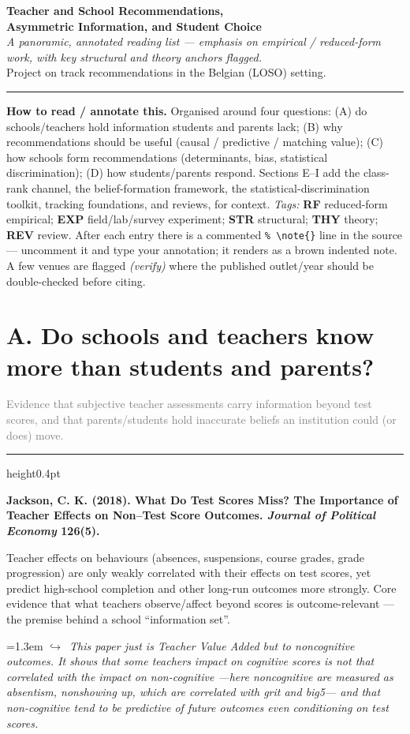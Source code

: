 \documentclass[11pt]{article}
\newcommand{\entry}[3]{%
  \par\medskip\noindent\textbf{#1}\par
  \nopagebreak #2\hspace{0.35em}{\small\color{tagcol}[#3]}\par}
\newcommand{\note}[1]{\par\smallskip\noindent\hangindent=1.3em
  \textcolor{notecol}{\footnotesize$\hookrightarrow$~\textit{#1}}}
\newcommand{\secintro}[1]{\par\smallskip\noindent\textcolor{grey}{\small #1}\par
  \vspace{2pt}\hrule height0.4pt\vspace{4pt}}
\begin{document}
\begin{center}
{\LARGE\bfseries\color{dark} Teacher and School Recommendations,\\[2pt]
Asymmetric Information, and Student Choice}\\[6pt]
{\color{grey}\itshape A panoramic, annotated reading list --- emphasis on empirical /
reduced-form work, with key structural and theory anchors flagged.}\\[2pt]
{\color{grey}\small Project on track recommendations in the Belgian (LOSO) setting.}
\end{center}
\vspace{4pt}
\hrule
\vspace{8pt}

\noindent\textbf{How to read / annotate this.} Organised around four questions:
(A) do schools/teachers hold information students and parents lack;
(B) why recommendations should be useful (causal / predictive / matching value);
(C) how schools form recommendations (determinants, bias, statistical discrimination);
(D) how students/parents respond. Sections E--I add the class-rank channel, the
belief-formation framework, the statistical-discrimination toolkit, tracking
foundations, and reviews, for context. \emph{Tags:}
\textbf{RF} reduced-form empirical; \textbf{EXP} field/lab/survey experiment;
\textbf{STR} structural; \textbf{THY} theory; \textbf{REV} review.
After each entry there is a commented \verb|% \note{}| line in the source ---
uncomment it and type your annotation; it renders as a brown indented note.
A few venues are flagged \emph{(verify)} where the published outlet/year should be
double-checked before citing.

\section{A. Do schools and teachers know more than students and parents?}
\secintro{Evidence that subjective teacher assessments carry information beyond
test scores, and that parents/students hold inaccurate beliefs an institution
could (or does) move.}





\entry{Jackson, C. K. (2018). What Do Test Scores Miss? The Importance of Teacher
Effects on Non--Test Score Outcomes. \textit{Journal of Political Economy}
126(5).}
{Teacher effects on behaviours (absences, suspensions, course grades, grade
progression) are only weakly correlated with their effects on test scores, yet
predict high-school completion and other long-run outcomes more strongly. Core
evidence that what teachers observe/affect beyond scores is outcome-relevant ---
the premise behind a school ``information set''.}{RF}
\note{This paper just is Teacher Value Added but to noncognitive outcomes. It shows that some teachers impact on cognitive scores is not that correlated with the impact on non-cognitive ---here noncognitive are measured as absentism, nonshowing up, which are correlated with grit and big5--- and that non-cognitive tend to be predictive of future outcomes even conditioning on test scores.}
\end{document}
